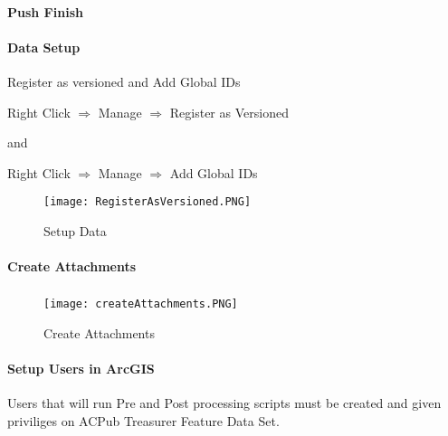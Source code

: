 \paragraph*{\Large Push Finish}
\clearpage
\paragraph[Data Setup]{\Large Data Setup\texorpdfstring{\\}{}}
Register as versioned and Add Global IDs
\vspace{.2in}

{\large Right Click $\Rightarrow$ Manage $\Rightarrow$ Register as Versioned}
\vspace{.2in}

and
\vspace{.2in}

{\large Right Click $\Rightarrow$ Manage $\Rightarrow$ Add Global IDs}
\vspace{.2in}

\begin{figure}[h!]
\centering
    \texttt{[image: RegisterAsVersioned.PNG]}
\caption{Setup Data}
\end{figure}
\clearpage
\paragraph[Create Attachments]{\Large Create Attachments\texorpdfstring{\\}{}}

\vspace{.3in}

\subparagraph*{}
\begin{figure}[h!]
\centering
    \texttt{[image: createAttachments.PNG]}
\caption{Create Attachments}
\end{figure}
\clearpage
\paragraph[Setup Users in ArcGIS]{\Large Setup Users in ArcGIS\texorpdfstring{\\}{}}

Users that will run Pre and Post processing scripts must be created and given priviliges on ACPub Treasurer Feature Data Set.
\vspace{.5in}

